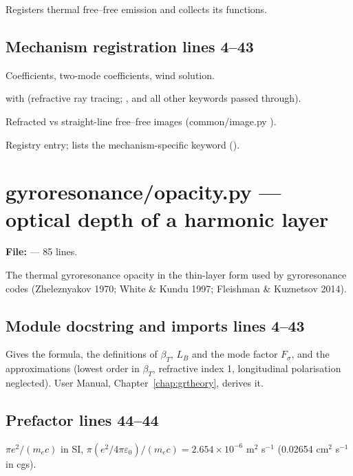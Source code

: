 Registers thermal free--free emission and collects its functions.

\section*{\normalsize Mechanism registration \hfill{\small\mdseries\color{gray}lines 4--43}}

\begin{lines}
\item[L.16–18] Coefficients, two-mode coefficients, wind solution.
\item[L.21]  with  (refractive ray tracing; ,  and all other keywords passed through).
\item[L.29] Refracted vs straight-line free--free images (common/image.py ).
\item[L.36] Registry entry;  lists the mechanism-specific keyword ().
\end{lines}

\chapter{gyroresonance/opacity.py --- optical depth of a harmonic layer}
\label{mod:gyroresonance:opacity.py}
\textbf{File:}  --- 85 lines.

The thermal gyroresonance opacity in the thin-layer form used by gyroresonance codes
(Zheleznyakov 1970; White \& Kundu 1997; Fleishman \& Kuznetsov 2014).

\section*{\normalsize Module docstring and imports \hfill{\small\mdseries\color{gray}lines 4--43}}

Gives the formula, the definitions of $\beta_T$, $L_B$ and the mode factor $F_\sigma$, and the approximations (lowest order in $\beta_T$, refractive index 1, longitudinal polarisation neglected). User Manual, Chapter~\ref{chap:grtheory}, derives it.

\section*{\normalsize Prefactor \hfill{\small\mdseries\color{gray}lines 44--44}}

\begin{lines}
\item[L.44] $\pi e^2/(m_ec)$ in SI, $\pi(e^2/4\pi\varepsilon_0)/(m_ec)=2.654\times10^{-6}$ m$^2$ s$^{-1}$ (0.02654 cm$^2$ s$^{-1}$ in cgs).
\end{lines}

